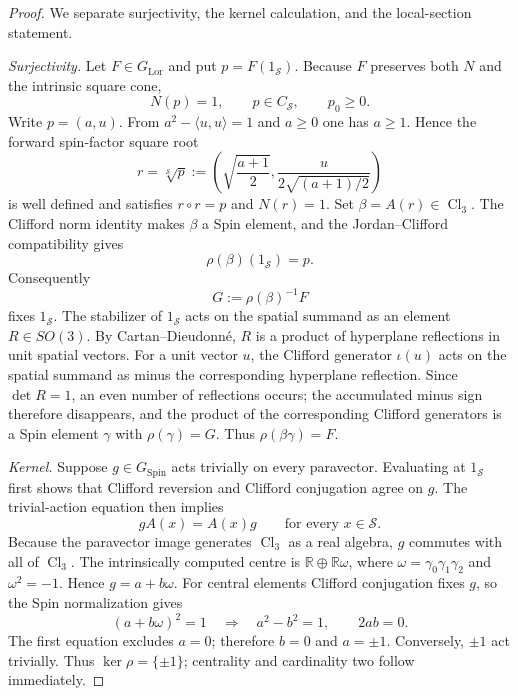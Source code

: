 \documentclass[11pt,a4paper]{article}
\theoremstyle{definition}
\theoremstyle{remark}
\newcommand{\R}{\mathbb{R}}
\newcommand{\Smodel}{\mathcal{S}}
\newcommand{\Cl}{\operatorname{Cl}}
\newcommand{\SpinG}{G_{\mathrm{Spin}}}
\newcommand{\LorG}{G_{\mathrm{Lor}}}
\begin{document}
\begin{proof}
We separate surjectivity, the kernel calculation, and the local-section
statement.

\emph{Surjectivity.}  Let \(F\in\LorG\) and put \(p=F(1_{\Smodel})\).
Because \(F\) preserves both \(N\) and the intrinsic square cone,
\[
    N(p)=1,
    \qquad
    p\in C_{\Smodel},
    \qquad
    p_0\ge 0.
\]
Write \(p=(a,u)\).  From \(a^2-\langle u,u\rangle=1\) and \(a\ge0\) one
has \(a\ge1\).  Hence the forward spin-factor square root
\[
 r=\sqrt[\Smodel]{p}
   :=\left(\sqrt{\frac{a+1}{2}},
      \frac{u}{2\sqrt{(a+1)/2}}\right)
\]
is well defined and satisfies \(r\circ r=p\) and \(N(r)=1\).  Set
\(\beta=A(r)\in\Cl_3\).  The Clifford norm identity makes \(\beta\) a Spin
element, and the Jordan--Clifford compatibility gives
\[
   \rho(\beta)(1_{\Smodel})=p.
\]
Consequently
\[
   G:=\rho(\beta)^{-1}F
\]
fixes \(1_{\Smodel}\).  The stabilizer of \(1_{\Smodel}\) acts on the
spatial summand as an element \(R\in SO(3)\).  By Cartan--Dieudonn\'e,
\(R\) is a product of hyperplane reflections in unit spatial vectors.
For a unit vector \(u\), the Clifford generator \(\iota(u)\) acts on the
spatial summand as minus the corresponding hyperplane reflection.  Since
\(\det R=1\), an even number of reflections occurs; the accumulated minus
sign therefore disappears, and the product of the corresponding Clifford
generators is a Spin element \(\gamma\) with \(\rho(\gamma)=G\).  Thus
\(\rho(\beta\gamma)=F\).

\emph{Kernel.}  Suppose \(g\in\SpinG\) acts trivially on every paravector.
Evaluating at \(1_{\Smodel}\) first shows that Clifford reversion and
Clifford conjugation agree on \(g\).  The trivial-action equation then
implies
\[
    gA(x)=A(x)g
    \qquad\text{for every }x\in\Smodel.
\]
Because the paravector image generates \(\Cl_3\) as a real algebra, \(g\)
commutes with all of \(\Cl_3\).  The intrinsically computed centre is
\(\R\oplus\R\omega\), where
\(\omega=\gamma_0\gamma_1\gamma_2\) and \(\omega^2=-1\).  Hence
\(g=a+b\omega\).  For central elements Clifford conjugation fixes \(g\),
so the Spin normalization gives
\[
   (a+b\omega)^2=1
   \quad\Longrightarrow\quad
   a^2-b^2=1,
   \qquad
   2ab=0.
\]
The first equation excludes \(a=0\); therefore \(b=0\) and
\(a=\pm1\).  Conversely, \(\pm1\) act trivially.  Thus
\(\ker\rho=\{\pm1\}\); centrality and cardinality two follow immediately.


\end{proof}
\end{document}
